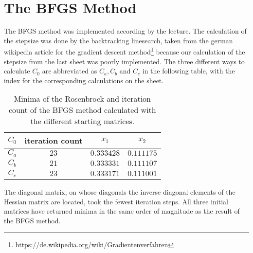 \section{The BFGS Method}
 The BFGS method was implemented according by the lecture. 
 The calculation of the stepsize was done by the backtracking linesearch, taken from the german wikipedia article for the gradient descent method\footnote{https://de.wikipedia.org/wiki/Gradientenverfahren} because our calculation of the stepsize from the last sheet was poorly implemented.
 The three different ways to calculate $C_0$ are abbreviated as $C_a,C_b$ and $C_c$ in the following table, with the index for the corresponding calculations on the sheet.
 \begin{table}[h]
    \centering
    \caption{Minima of the Rosenbrock and iteration count of the BFGS method calculated with the different starting matrices.}
    \label{tab:freq}
    \begin{tabular}{cccc}
        \toprule
        $C_0$ & iteration count & $x_1$ & $x_2$\\
        \midrule
        $C_a$ & $23$ & $0.333428$ & $0.111175$\\
        $C_b$ & $21$ & $0.333331$ & $0.111107$\\
        $C_c$ & $23$ & $0.333171$ & $0.111001$\\
    \end{tabular}
 \end{table}
 The diagonal matrix, on whose diagonals the inverse diagonal elements of the Hessian matrix are located, took the fewest iteration steps.
 All three initial matrices have returned minima in the same order of magnitude as the result of the BFGS method.
